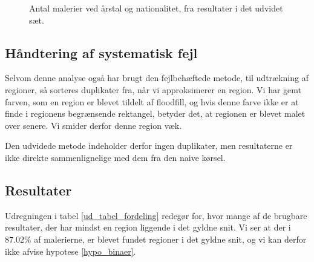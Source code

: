 {\begin{figure}[!h]
    \centering
    \hspace{1em}
    \caption[]{Antal malerier ved årstal og nationalitet, fra resultater i det udvidet sæt.}
    \label{ud_year_nation}
\end{figure}

\subsection{Håndtering af systematisk fejl}
Selvom denne analyse også har brugt den fejlbehæftede metode, til
udtrækning af regioner, så sorteres duplikater fra, når vi approksimerer
en region. Vi har gemt farven, som en region er blevet tildelt af
floodfill, og hvis denne farve ikke er at finde i regionens begrænsende
rektangel, betyder det, at regionen er blevet malet over senere. Vi
smider derfor denne region væk.

Den udvidede metode indeholder derfor ingen duplikater, men resultaterne
er ikke direkte sammenlignelige med dem fra den naive kørsel.

\subsection{Resultater}
Udregningen i tabel \ref{ud_tabel_fordeling} redegør for, hvor mange af
de brugbare resultater, der har mindst en region liggende i det gyldne
snit. Vi ser at der i $87.02\%$ af malerierne, er blevet fundet regioner
i det gyldne snit, og vi kan derfor ikke afvise hypotese
\ref{hypo_binaer}.

}
